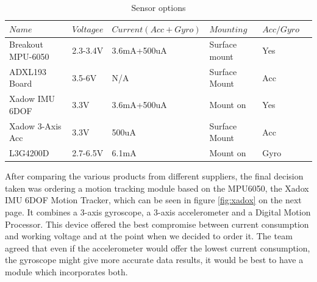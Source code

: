 \begin{table}[h]
	\centering
	\caption{Sensor options}
	\label{table: 1}
	\begin{tabular}{llllll}
		\hline
		$Name$ & $Voltagee$ & $Current(Acc+Gyro)$ & $Mounting$ & $Acc/Gyro$ \\
		\hline
		Breakout MPU-6050 & 2.3-3.4V & 3.6mA+500uA & Surface mount & Yes\\
		\hline
		 ADXL193 Board & 3.5-6V & N/A & Surface Mount & Acc \\
		\hline
		Xadow IMU 6DOF  & 3.3V &  3.6mA+500uA & Mount on & Yes \\
		\hline
		Xadow 3-Axis Acc &  3.3V & 500uA & Surface Mount & Acc \\
		\hline
		 L3G4200D &  2.7-6.5V & 6.1mA & Mount on  & Gyro \\
		\hline
		
		\end{tabular}
			
\end{table}
After comparing the various products from different suppliers, the final decision taken was ordering a motion tracking module based on the MPU6050, the Xadox IMU 6DOF Motion Tracker, which can be seen in figure \ref{fig:xadox} on the next page. It combines a 3-axis gyroscope, a 3-axis accelerometer and a Digital Motion Processor. This device offered the best compromise between current consumption and working voltage and at the point when we decided to order it. The team agreed that even if the accelerometer would offer the lowest current consumption, the gyroscope might give more accurate data results, it would be best to have a module which incorporates both.
